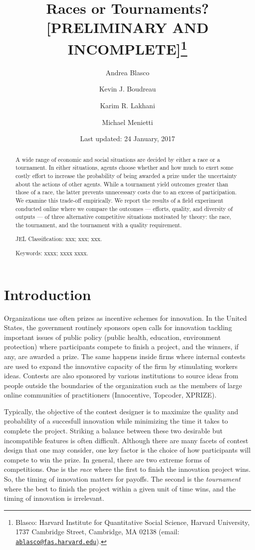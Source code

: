 \documentclass[12pt,]{article}
\title{Races or Tournaments? {[}PRELIMINARY AND INCOMPLETE{]}\thanks{Blasco: Harvard Institute for Quantitative Social Science, Harvard
University, 1737 Cambridge Street, Cambridge, MA 02138 (email:
\href{mailto:ablasco@fas.harvard.edu}{\nolinkurl{ablasco@fas.harvard.edu}}).}}
\author{Andrea Blasco \and Kevin J. Boudreau \and Karim R. Lakhani \and Michael Menietti}
\date{Last updated: 24 January, 2017}
\begin{document}
\maketitle
\begin{abstract}
A wide range of economic and social situations are decided by either a
race or a tournament. In either situations, agents choose whether and
how much to exert some costly effort to increase the probability of
being awarded a prize under the uncertainty about the actions of other
agents. While a tournament yield outcomes greater than those of a race,
the latter prevents unnecessary costs due to an excess of participation.
We examine this trade-off empirically. We report the results of a field
experiment conducted online where we compare the outcomes --- efforts,
quality, and diversity of outputs --- of three alternative competitive
situations motivated by theory: the race, the tournament, and the
tournament with a quality requirement.

\smallskip\noindent 
JEL Classification: xxx; xxx; xxx.

\smallskip\noindent 
Keywords: xxxx; xxxx xxxx.
\end{abstract}


\clearpage
\tableofcontents
\setcounter{tocdepth}{2}
\clearpage

\section{Introduction}\label{introduction}

Organizations use often prizes as incentive schemes for innovation. In
the United States, the government routinely sponsors open calls for
innovation tackling important issues of public policy (public health,
education, environment protection) where participants compete to finish
a project, and the winners, if any, are awarded a prize. The same
happens inside firms where internal contests are used to expand the
innovative capacity of the firm by stimulating workers ideas. Contests
are also sponsored by various institutions to source ideas from people
outside the boundaries of the organization such as the members of large
online communities of practitioners (Innocentive, Topcoder, XPRIZE).

Typically, the objective of the contest designer is to maximize the
quality and probability of a succesfull innovation while minimizing the
time it takes to complete the project. Striking a balance between these
two desirable but incompatible features is often difficult. Although
there are many facets of contest design that one may consider, one key
factor is the choice of how participants will compete to win the prize.
In general, there are two extreme forms of competitions. One is the
\emph{race} where the first to finish the innovation project wins. So,
the timing of innovation matters for payoffs. The second is the
\emph{tournament} where the best to finish the project within a given
unit of time wins, and the timing of innovation is irrelevant.
\end{document}
